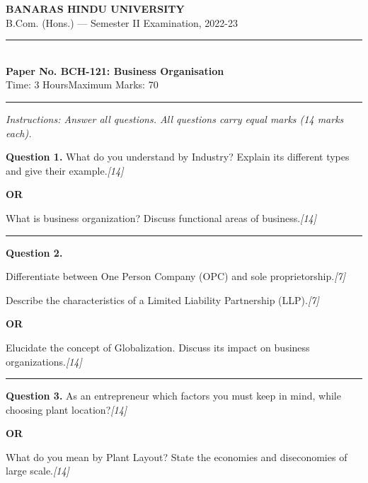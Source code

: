 \documentclass[11pt,a4paper]{article}
\newcommand{\pts}[1]{\hfill   \textit{[#1]}}
\begin{document}
\begin{center}
  {\large\bfseries BANARAS HINDU UNIVERSITY}\\[2pt]
  {\normalsize B.Com. (Hons.) --- Semester II Examination, 2022-23}\\[6pt]
  \rule{0.8\linewidth}{0.5pt}\\[6pt]
  {\large\bfseries Paper No. BCH-121: Business Organisation}\\[4pt]
  {\normalsize Time: 3 Hours\hfill Maximum Marks: 70}
\end{center}

\rule{\linewidth}{0.4pt}

\smallskip



\noindent   \textit{Instructions: Answer all questions. All questions carry equal marks (14 marks each).}

\bigskip




\noindent   \textbf{Question 1.}
What do you understand by Industry? Explain its different types and give their example.\pts{14}

\centerline{   \textbf{OR}}

What is business organization? Discuss functional areas of business.\pts{14}

\medskip\rule{\linewidth}{0.2pt}




\noindent   \textbf{Question 2.}

\begin{parts}
  \item Differentiate between One Person Company (OPC) and sole proprietorship.\pts{7}
  \item Describe the characteristics of a Limited Liability Partnership (LLP).\pts{7}
\end{parts}

\centerline{   \textbf{OR}}

Elucidate the concept of Globalization. Discuss its impact on business organizations.\pts{14}

\medskip\rule{\linewidth}{0.2pt}




\noindent   \textbf{Question 3.}
As an entrepreneur which factors you must keep in mind, while choosing plant location?\pts{14}

\centerline{   \textbf{OR}}

What do you mean by Plant Layout? State the economies and diseconomies of large scale.\pts{14}
\end{document}
